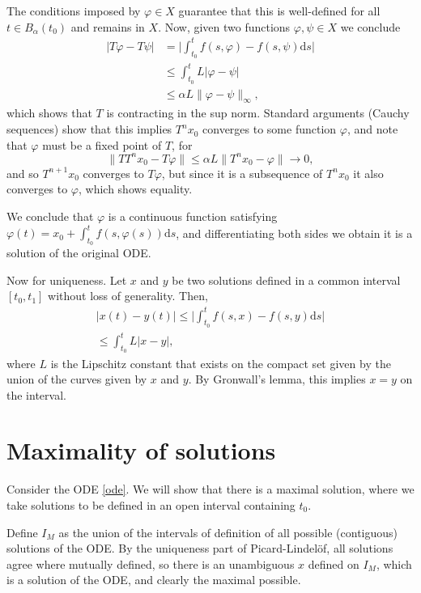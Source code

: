 \documentclass{article}
\newcommand{\dd}{\mathrm{d}}
\begin{document}
The conditions imposed by $\varphi \in X$ guarantee that this is well-defined for all $t \in B_\alpha(t_0)$ and remains in $X$. Now, given two functions $\varphi, \psi \in X$ we conclude
\begin{align*}
\lvert T \varphi - T\psi \rvert &= \lvert \int_{t_0}^t f(s, \varphi) - f(s, \psi) \dd s \rvert\\
&\leq \int_{t_0}^t L \lvert \varphi - \psi \rvert\\
&\leq \alpha L \lVert \varphi - \psi \rVert_\infty,
\end{align*}
which shows that $T$ is contracting in the sup norm. Standard arguments (Cauchy sequences) show that this implies $T^n x_0$ converges to some function $\varphi$, and note that $\varphi$ must be a fixed point of $T$, for
\[\lVert T T^n x_0 - T \varphi \rVert \leq \alpha L \lVert T^n x_0 - \varphi \rVert \to 0,\]
and so $T^{n+1} x_0$ converges to $T \varphi$, but since it is a subsequence of $T^n x_0$ it also converges to $\varphi$, which shows equality.

We conclude that $\varphi$ is a continuous function satisfying $\varphi(t) = x_0 + \int_{t_0}^t f(s, \varphi(s)) \dd s$, and differentiating both sides we obtain it is a solution of the original ODE.

Now for uniqueness. Let $x$ and $y$ be two solutions defined in a common interval $[t_0, t_1]$ without loss of generality. Then,
\begin{align*}
\lvert x(t) - y(t) \rvert \leq \lvert \int_{t_0}^t f(s,x) - f(s,y) \dd s \rvert\\
\leq \int_{t_0}^t L \lvert x - y \rvert,
\end{align*}
where $L$ is the Lipschitz constant that exists on the compact set given by the union of the curves given by $x$ and $y$. By Gronwall's lemma, this implies $x = y$ on the interval.

\section{Maximality of solutions}

Consider the ODE \eqref{ode}. We will show that there is a maximal solution, where we take solutions to be defined in an open interval containing $t_0$.

Define $I_M$ as the union of the intervals of definition of all possible (contiguous) solutions of the ODE. By the uniqueness part of Picard-Lindelöf, all solutions agree where mutually defined, so there is an unambiguous $x$ defined on $I_M$, which is a solution of the ODE, and clearly the maximal possible.
\end{document}
